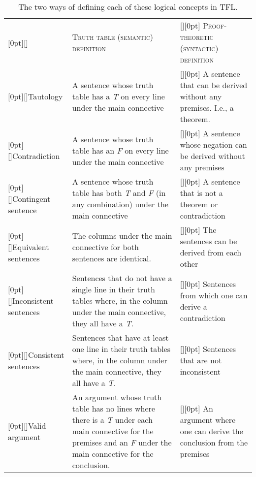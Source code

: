 \begin{sidewaystable}\centering\sffamily\footnotesize 
{}
\begin{tabularx}{1.0\linewidth}{@{}>{\columncolor{white}[0pt][\tabcolsep]} l  X >{\columncolor{white}[\tabcolsep][0pt]} X @{}}
				&	\textsc{Truth table (semantic) definition} 	&	\textsc{Proof-theoretic (syntactic) definition} \\
				
\rowcolor{blue!5}Tautology   &	A sentence whose truth table has a \textit{T} on every line under the main connective & A sentence that can be derived without any premises. I.e., a theorem.\\
 
Contradiction		&	A sentence whose truth table has an \textit{F} on every line under the main connective  &	A sentence whose negation can be derived without any premises\\

\rowcolor{blue!5}Contingent sentence	&	A sentence whose truth table has both \textit{T} and \textit{F} (in any combination) under the main connective & A sentence that is not a theorem or contradiction \\

Equivalent sentences &	The columns under the main connective for both sentences are identical.& The sentences can be derived from each other	\\

\rowcolor{blue!5}Inconsistent sentences	&	Sentences that do not have a single line in their truth tables where, in the column under the main connective, they all have a \textit{T}.	& Sentences  from which one can derive a contradiction \\

Consistent sentences	&	Sentences that have at least one line in their truth tables where, in the column under  the main connective, they all have a  \textit{T}. & Sentences that are not inconsistent	\\

\rowcolor{blue!5}Valid argument		&	An argument whose truth table has no lines where there is a  \textit{T} under each main connective for the premises and an  \textit{F} under the main connective for the conclusion.  & An argument where one can derive the conclusion from the premises	\\ 
\end{tabularx}
\caption{The two ways of defining each of these logical concepts in TFL.}\label{table:truth_tables_or_derivations}
\end{sidewaystable}

